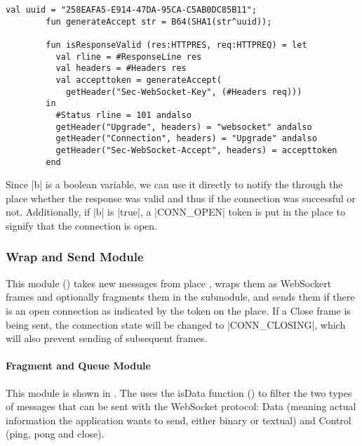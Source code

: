 		\begin{lstlisting}[label=lst:isResponseValid,caption=isResponseValid,gobble=2,float]
		val uuid = "258EAFA5-E914-47DA-95CA-C5AB0DC85B11";
		fun generateAccept str = B64(SHA1(str^uuid));
		
		fun isResponseValid (res:HTTPRES, req:HTTPREQ) = let
		  val rline = #ResponseLine res
		  val headers = #Headers res
		  val accepttoken = generateAccept(
		    getHeader("Sec-WebSocket-Key", (#Headers req)))
		in
		  #Status rline = 101 andalso
		  getHeader("Upgrade", headers) = "websocket" andalso
		  getHeader("Connection", headers) = "Upgrade" andalso
		  getHeader("Sec-WebSocket-Accept", headers) = accepttoken
		end
		\end{lstlisting}
		
		Since |b| is a boolean variable, we can use it directly to
		notify the  through the  place
		whether the response was valid and thus if the connection was successful or not.
		Additionally, if |b| is |true|, a |CONN_OPEN| token is put in the
		 place to signify that the connection is open.
		
	\subsubsection{Wrap and Send Module}
		
		
		This module () takes new messages from place
		, wraps them as WebSockert frames and optionally fragments
		them in the  submodule, and sends them if there is an open
		connection as indicated by the token on the 
		place. If a Close frame is being sent, the connection state will be changed to
		|CONN_CLOSING|, which will also prevent sending of subsequent frames.
		
		\paragraph{Fragment and Queue Module}
			
			
			This module is shown in . The 
			 uses the isData function () to filter
			the two types of messages that can be sent with the WebSocket protocol:
			Data (meaning actual information the application wants to send, either
			binary or textual) and Control (ping, pong and close).
			
